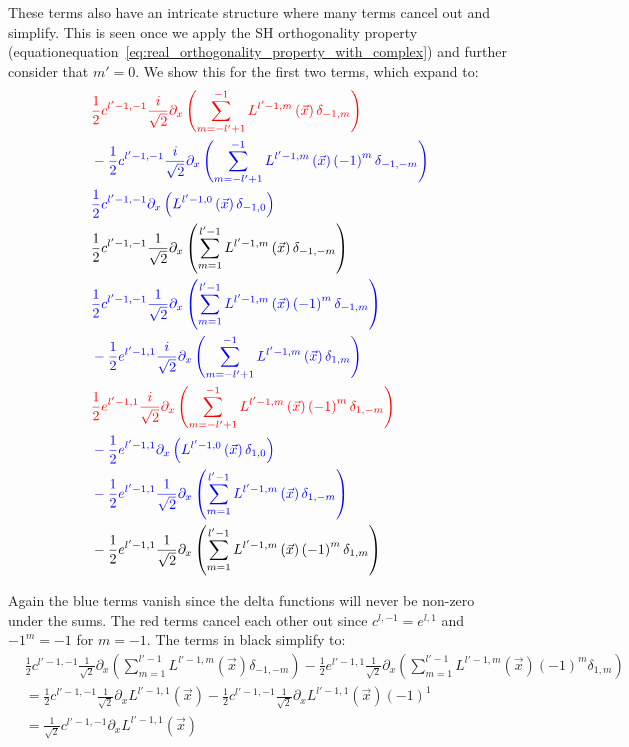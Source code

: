 \documentclass[10pt]{scrartcl}
\begin{document}
These terms also have an intricate structure where many terms cancel out and simplify. This is seen once we apply the SH orthogonality property (equationequation~\ref{eq:real_orthogonality_property_with_complex}) and further consider that $m'=0$. We show this for the first two terms, which expand to:
\begin{align*}
&
\mathcolor{red}
{
\frac{1}{2}c^{{l'-1,-1}}\frac{i}{\sqrt{2}}\partial_x\left(\sum_{m=-l'+1}^{-1}{L^{{l'-1,m}}\left (\vec{x} \right )\delta_{-1,m}}\right)
}
\\&
\mathcolor{blue}
{
-\frac{1}{2}c^{{l'-1,-1}}\frac{i}{\sqrt{2}}\partial_x\left(\sum_{m=-l'+1}^{-1}{L^{{l'-1,m}}\left (\vec{x} \right )\left({-1}\right)^{m}\delta_{-1,-m}}\right)
}
\\&
\mathcolor{blue}
{
\frac{1}{2}c^{{l'-1,-1}}\partial_x\left(L^{{l'-1,0}}\left (\vec{x} \right )\delta_{-1,0}\right)
}
\\&
\frac{1}{2}c^{{l'-1,-1}}\frac{1}{\sqrt{2}}\partial_x\left(\sum_{m=1}^{l'-1}{L^{{l'-1,m}}\left (\vec{x} \right )\delta_{-1,-m}}\right)
\\&
\mathcolor{blue}
{
\frac{1}{2}c^{{l'-1,-1}}\frac{1}{\sqrt{2}}\partial_x\left(\sum_{m=1}^{l'-1}{L^{{l'-1,m}}\left (\vec{x} \right )\left({-1}\right)^{m}\delta_{-1,m}}\right)
}
\\&
\mathcolor{blue}
{
-\frac{1}{2}e^{{l'-1,1}}\frac{i}{\sqrt{2}}\partial_x\left(\sum_{m=-l'+1}^{-1}{L^{{l'-1,m}}\left (\vec{x} \right )\delta_{1,m}}\right)
}
\\&
\mathcolor{red}
{
\frac{1}{2}e^{{l'-1,1}}\frac{i}{\sqrt{2}}\partial_x\left(\sum_{m=-l'+1}^{-1}{L^{{l'-1,m}}\left (\vec{x} \right )\left({-1}\right)^{m}\delta_{1,-m}}\right)
}
\\&
\mathcolor{blue}
{
-\frac{1}{2}e^{{l'-1,1}}\partial_x\left(L^{{l'-1,0}}\left (\vec{x} \right )\delta_{1,0}\right)
}
\\&
\mathcolor{blue}
{
-\frac{1}{2}e^{{l'-1,1}}\frac{1}{\sqrt{2}}\partial_x\left(\sum_{m=1}^{l'-1}{L^{{l'-1,m}}\left (\vec{x} \right )\delta_{1,-m}}\right)
}
\\&
-\frac{1}{2}e^{{l'-1,1}}\frac{1}{\sqrt{2}}\partial_x\left(\sum_{m=1}^{l'-1}{L^{{l'-1,m}}\left (\vec{x} \right )\left({-1}\right)^{m}\delta_{1,m}}\right)
\end{align*}

Again the blue terms vanish since the delta functions will never be non-zero under the sums. The red terms cancel each other out since $c^{l,-1}=e^{l,1}$ and $-1^m=-1$ for $m=-1$. The terms in black simplify to:
\begin{align*}
&
\frac{1}{2}c^{{l'-1,-1}}\frac{1}{\sqrt{2}}\partial_x\left(\sum_{m=1}^{l'-1}{L^{{l'-1,m}}\left (\vec{x} \right )\delta_{-1,-m}}\right)
-\frac{1}{2}e^{{l'-1,1}}\frac{1}{\sqrt{2}}\partial_x\left(\sum_{m=1}^{l'-1}{L^{{l'-1,m}}\left (\vec{x} \right )\left({-1}\right)^{m}\delta_{1,m}}\right)
\\&
=
\frac{1}{2}c^{{l'-1,-1}}\frac{1}{\sqrt{2}}\partial_xL^{{l'-1,1}}\left (\vec{x} \right )
-\frac{1}{2}c^{{l'-1,-1}}\frac{1}{\sqrt{2}}\partial_xL^{{l'-1,1}}\left (\vec{x} \right )\left({-1}\right)^{1}
\\&
=
\frac{1}{\sqrt{2}}c^{{l'-1,-1}}\partial_xL^{{l'-1,1}}\left (\vec{x} \right )
\end{align*}
\end{document}
